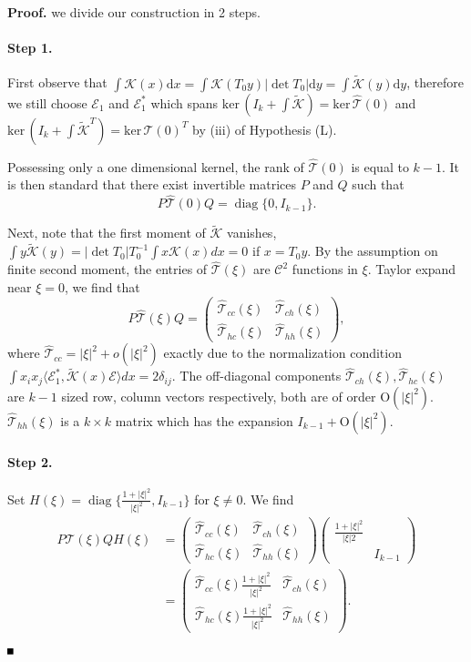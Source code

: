 \documentclass[10pt]{article}
\newenvironment{Proof}%
 {\begin{trivlist} \item[]{\bf Proof. }}%
 {\hspace*{\fill}$\rule{.4\baselineskip}{.4\baselineskip}$\end{trivlist}}
\newcommand{\Ns}{\mathrm{ker\,}}
\newcommand{\rmO}{\mathrm{O}}
\newcommand{\rmd}{\mathrm{d}}
\newcommand{\K}{\mathcal{K}}
\newcommand{\That}{\widehat{\mathcal{T}}}
\newcommand{\diag}{\operatorname{diag}}
\begin{document}
\begin{Proof}
 we divide our construction in 2 steps.

\paragraph{Step 1.}First observe that $\int \K(x)\rmd x = \int \K(T_0y)|\det T_0| \rmd y= \int \tilde{\K}(y)\rmd y$, therefore we still choose $\mathcal{E}_1$ and $\mathcal{E}_1^*$ which spans $\Ns(I_k+\int \tilde{\K}) = \Ns \That(0)$ and $\Ns (I_k+\int \tilde{\K}^T)=\Ns \That(0)^T$ by (iii) of Hypothesis (L).

 
 Possessing only a one dimensional kernel, the rank of $\widehat{\mathcal{T}}(0)$ is equal to $k-1$. It is then standard that there exist invertible matrices $P$ and $Q$ such that
\[
P\That(0)Q = \diag\{0,I_{k-1}\}.
\]

Next, note that the first moment of $\tilde{\K}$ vanishes, $\int y\tilde{\K}(y) = |\det T_0|T_0^{-1}\int  x\K(x) dx = 0$ if $x = T_0y$. By the assumption on finite second moment, the entries of $\That(\xi)$ are $\mathscr{C}^2$ functions in $\xi$. Taylor expand near $\xi = 0$, we find that
\[
P\That(\xi)Q = \begin{pmatrix}
\That_{cc}(\xi)& \That_{ch}(\xi)\\
\That_{hc}(\xi)& \That_{hh}(\xi) 
\end{pmatrix},
\]
where $\That_{cc} = |\xi|^2+o(|\xi|^2)$ exactly due to the normalization condition $\int x_ix_j\langle \mathcal{E}_1^*, \tilde{\K}(x)\mathcal{E}\rangle dx = 2\delta_{ij}$. The off-diagonal components $\That_{ch}(\xi), \That_{hc}(\xi)$ are $k-1$ sized row, column vectors respectively, both are of order $\rmO(|\xi|^2)$. $\That_{hh}(\xi)$ is a $k\times k$ matrix which has the expansion $I_{k-1}+\rmO(|\xi|^2)$. 



\paragraph{Step 2.} Set $
H(\xi) = \diag\{\frac{1+|\xi|^2}{|\xi|^2}, I_{k-1}\}$ for $\xi \neq 0$. 
We find
\begin{align*}
P\That(\xi)QH(\xi) &= \begin{pmatrix}
\That_{cc}(\xi)& \That_{ch}(\xi)\\
\That_{hc}(\xi)& \That_{hh}(\xi) 
\end{pmatrix} \begin{pmatrix}
\frac{1+|\xi|^2}{|\xi|2}& \\
& I_{k-1} 
\end{pmatrix}\\
&= \begin{pmatrix}
\That_{cc}(\xi)\frac{1+|\xi|^2}{|\xi|^2} & \That_{ch}(\xi)\\
\That_{hc}(\xi)\frac{1+|\xi|^2}{|\xi|^2} & \That_{hh}(\xi)
\end{pmatrix}.
\end{align*}


\end{Proof}
\end{document}
